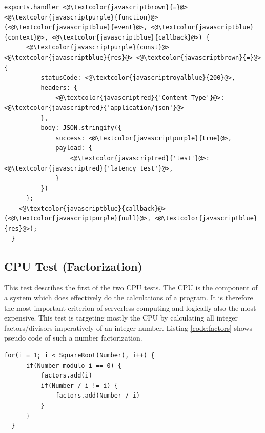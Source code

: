 \begin{minipage}{\linewidth}
\begin{lstlisting}[frame=single,caption={Latency test implementation on AWS in Node.js},label=code:latency,linewidth=.82\textwidth,xleftmargin=.18\textwidth]
  exports.handler <@\textcolor{javascriptbrown}{=}@> <@\textcolor{javascriptpurple}{function}@>(<@\textcolor{javascriptblue}{event}@>, <@\textcolor{javascriptblue}{context}@>, <@\textcolor{javascriptblue}{callback}@>) {
      <@\textcolor{javascriptpurple}{const}@> <@\textcolor{javascriptblue}{res}@> <@\textcolor{javascriptbrown}{=}@> {
          statusCode: <@\textcolor{javascriptroyalblue}{200}@>,
          headers: {
              <@\textcolor{javascriptred}{'Content-Type'}@>: <@\textcolor{javascriptred}{'application/json'}@>
          },
          body: JSON.stringify({
              success: <@\textcolor{javascriptpurple}{true}@>,
              payload: {
                  <@\textcolor{javascriptred}{'test'}@>: <@\textcolor{javascriptred}{'latency test'}@>,
              }
          })
      };
    <@\textcolor{javascriptblue}{callback}@>(<@\textcolor{javascriptpurple}{null}@>, <@\textcolor{javascriptblue}{res}@>);
  }
\end{lstlisting}
\end{minipage}

\subsection{CPU Test (Factorization)}
\label{sec:factors_test}
This test describes the first of the two \gls{CPU} tests. The \gls{CPU} is the component of a system which does effectively do the calculations of a program. It is therefore the most important criterion of serverless computing and logically also the most expensive. This test is targeting mostly the \gls{CPU} by calculating all integer factors/divisors imperatively of an integer number. Listing \ref{code:factors} shows pseudo code of such a number factorization.

\begin{minipage}{\linewidth}
\begin{lstlisting}[frame=single,caption={Factorization test pseudo code},label=code:factors,linewidth=.75\textwidth,xleftmargin=.25\textwidth]
  for(i = 1; i < SquareRoot(Number), i++) {
      if(Number modulo i == 0) {
          factors.add(i)
          if(Number / i != i) {
              factors.add(Number / i)
          }
      }
  }
\end{lstlisting}
\end{minipage}
\newline

